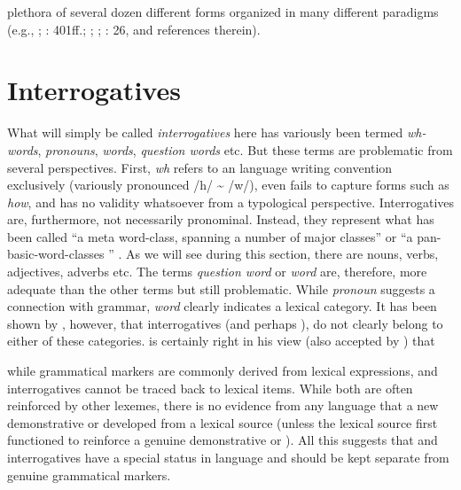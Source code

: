 plethora of several dozen different forms organized in many different paradigms (e.g., \citealt{Amha2007,Amha2012}; \citealt{Hellenthal2010}: 401ff.; \citealt{Köhler2013,Köhler2016}; \citealt{Treis2014}; \citealt{Hölzl2016a}: 26, and references therein).

\section{Interrogatives}\label{sec:4.3}

What will simply be called \textit{interrogatives} here has variously been termed \textit{wh-words}, \textit{ pronouns}, \textit{ words}, \textit{question words} etc. But these terms are problematic from several perspectives. First, \textit{wh} refers to an  language writing convention exclusively (variously pronounced /h/ {\textasciitilde} /w/), even fails to capture  forms such as \textit{how}, and has no validity whatsoever from a typological perspective. Interrogatives are, furthermore, not necessarily pronominal. Instead, they represent what has been called “a meta word-class, spanning a number of major classes” \citep[80]{Dixon2002} or “a pan-basic-word-classes ” \citep[409]{Dixon2012}. As we will see during this section, there are  nouns, verbs, adjectives, adverbs etc. The terms \textit{question word} or \textit{ word} are, therefore, more adequate than the other terms but still problematic. While \textit{pronoun} suggests a connection with grammar, \textit{word} clearly indicates a lexical category. It has been shown by \citet{Diessel2003}, however, that interrogatives (and perhaps ), do not clearly belong to either of these categories. \citet[636]{Diessel2003} is certainly right in his view (also accepted by \citealt{CysouwHackstein2011}) that

\begin{modquote}
while grammatical markers are commonly derived from lexical expressions,  and interrogatives cannot be traced back to lexical items. While both are often reinforced by other lexemes, there is no evidence from any language that a new demonstrative or  developed from a lexical source (unless the lexical source first functioned to reinforce a genuine demonstrative or ). All this suggests that  and interrogatives have a special status in language and should be kept separate from genuine grammatical markers.
\end{modquote}

